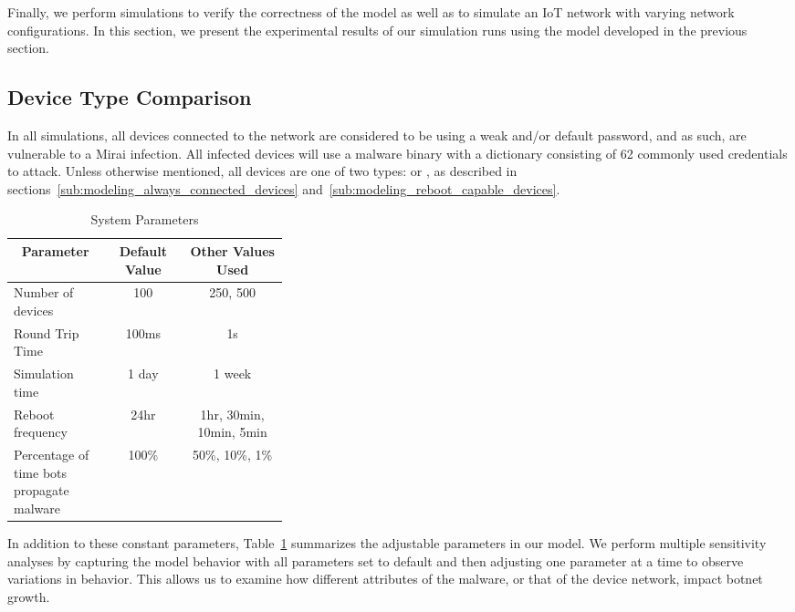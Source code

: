 Finally, we perform simulations to verify the correctness of the model as well as to simulate an IoT network with varying network configurations. In this section, we present the experimental results of our simulation runs using the model developed in the previous section.

\subsection{Device Type Comparison}
\label{sub:device_type_comparison}
In all simulations, all devices connected to the network are considered to be using a weak and/or default password, and as such, are vulnerable to a Mirai infection. All infected devices will use a malware binary with a dictionary consisting of 62 commonly used credentials to attack. Unless otherwise mentioned, all devices are one of two types: \AC or \RC, as described in sections~\ref{sub:modeling_always_connected_devices} and~\ref{sub:modeling_reboot_capable_devices}.
\renewcommand{\arraystretch}{1.5}
\begin{table}[h]
    \caption{\label{table:parameters}System Parameters}
    \begin{tabularx}{\linewidth}{| m{0.35\linewidth} c c |}
       \hline 
    	\multicolumn{1}{|c}{Parameter} & Default Value & Other Values Used\\
    	\hline 
    	Number of devices & 100 & 250, 500\\ 
    	Round Trip Time & 100ms & 1s\\ 
    	Simulation time & 1 day & 1 week\\ 
    	Reboot frequency  & 24hr & 1hr, 30min, 10min, 5min\\ 
    	Percentage of time bots propagate malware & 100\% & 50\%, 10\%, 1\%\\ 
    	\hline
    \end{tabularx}
\end{table}
\renewcommand{\arraystretch}{1}
\par
In addition to these constant parameters, Table~\ref{table:parameters} summarizes the adjustable parameters in our model. We perform multiple sensitivity analyses by capturing the model behavior with all parameters set to default and then adjusting one parameter at a time to observe variations in behavior. This allows us to examine how different attributes of the malware, or that of the device network, impact botnet growth. 

